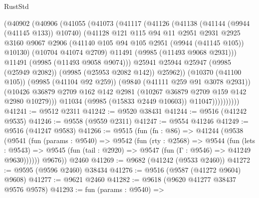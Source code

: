 \begin{lexlean}{RustStd}
\begin{coremodule}
                  (@40902
                    (@40906
                      (@41055
                        (@41073
                          (@41117
                            (@41126
                              (@41138
                                (@41144 (@9944 (@41145 @133)) @10740)
                                (@41128
                                  @121
                                  @115
                                  @94
                                  @11
                                  @2951
                                  @2931
                                  @2925
                                  @3160
                                  @9067
                                  @2906
                                  (@41140 @105 @94 @105 @2951 (@9944 (@41145 @105)) @10130)
                                  (@10704 @41074 @2709)
                                  @11491
                                  (@9985 (@11493 @9068 @2931)))
                                @11491
                                (@9985 (@11493 @9058 @9074)))
                              @25941
                              @25944
                              @25947
                              (@9985 (@25949 @2082))
                              (@9985 (@25953 @2082 @142))
                              @25962))
                          (@10370 (@41100 @105))
                          (@9985 (@41104 @92 @259))
                          (@9840 (@41111 @259 @91 @3078 @2931))
                          (@10426
                            @36879
                            @2709
                            @162
                            @142
                            @2981
                            (@10267 @36879 @2709 @159 @142 @2980 @10279)))
                        @11034
                        (@9985 (@15833 @2449 @10603))
                        @11047))))))))))
@41241 := @9512 @2311
@41242 := @9520 @38431
@41244 := @9516 (@41242 @9535)
@41246 := @9558 (@9559 @2311)
@41247 := @9554 @41246
@41249 := @9516 (@41247 @9583)
@41266 := @9515
    (fun (fn : @86) =>
    @41244
      (@9538
        (@9541
          (fun (params : @9540) =>
          @9542
            (fun (rty : @2568) =>
            @9544
              (fun (lets : @9543) =>
              @9545 (fun (tail : @2920) => @9547 (fun (Γ : @9546) => @41249 @9630))))))
        @9676))
    @2460
@41269 := @9682 (@41242 (@9533 @2460))
@41272 := @9595 (@9596 @2460) @38434
@41276 := @9516 (@9587 (@41272 @9604) @9608)
@41277 := @9621 @2460
@41282 := @9618 (@9620 @41277 @38437 @9576 @9578)
@41293 := fun (params : @9540) =>

\end{coremodule}
\end{lexlean}
